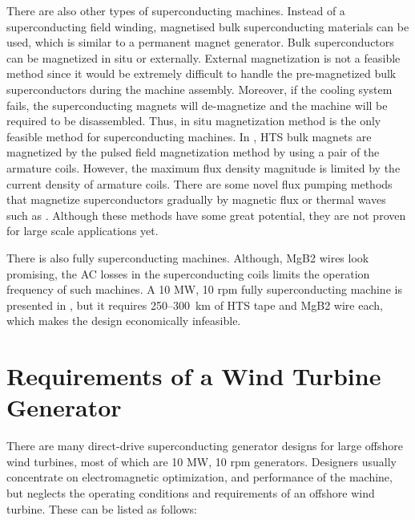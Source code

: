 \documentclass[12pt]{IET02}
\begin{document}
There are also other types of superconducting machines. Instead of a superconducting field winding, magnetised bulk superconducting materials can be used, which is similar to a permanent magnet generator. Bulk superconductors can be magnetized in situ or externally. External magnetization is not a feasible method since it would be extremely difficult to handle the pre-magnetized bulk superconductors during the machine assembly. Moreover, if the cooling system fails,  the superconducting magnets will de-magnetize and the machine will be required to be disassembled.  
Thus, in situ magnetization method is the only feasible method for superconducting machines. 
In \cite{Matsuzaki2007}, HTS bulk magnets are magnetized by the pulsed field magnetization method by using a pair of the armature coils. However, the maximum flux density magnitude is limited by the current density of armature coils. There are some novel flux pumping methods that magnetize superconductors gradually by magnetic flux or thermal waves such as \cite{Masson2007b,Coombs2009}. Although these methods have some great potential, they are not proven for large scale applications yet.

There is also fully superconducting machines. Although, MgB2 wires look promising, the AC losses in the superconducting coils limits the operation frequency of such machines. A 10 MW, 10 rpm fully superconducting machine is presented in \cite{Terao2012}, but it requires 250--300~km of HTS tape and MgB2 wire each, which makes the design economically infeasible.

\section{Requirements of a Wind Turbine Generator}

There are many direct-drive superconducting generator designs for large offshore wind turbines, most of which are 10 MW, 10 rpm generators. Designers usually concentrate on electromagnetic optimization, and performance of the machine, but neglects the operating conditions and requirements of an offshore wind turbine. These can be listed as follows:
\end{document}
